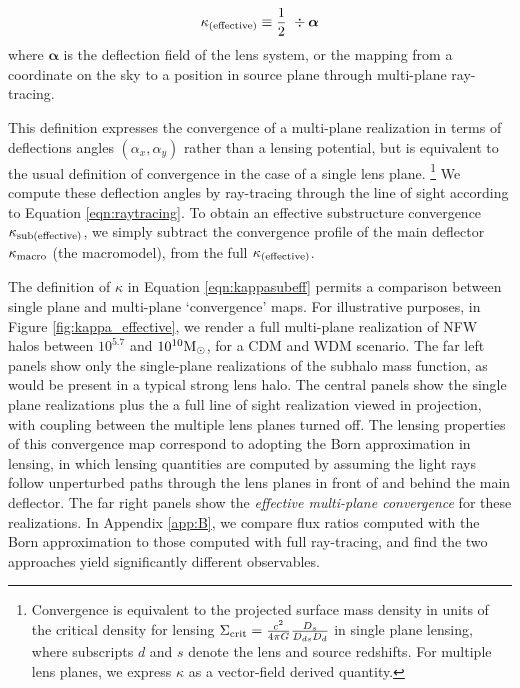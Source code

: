 \begin{equation}
\label{eqn:kappasubeff}
\kappa_{\rm{(effective)}}  \equiv \frac{1}{2} \ \div{ \boldsymbol{\alpha}}
\end{equation}
where $\boldsymbol{\alpha}$ is the deflection field of the lens system, or the mapping from a coordinate on the sky to a position in source plane through multi-plane ray-tracing.

This definition expresses the convergence of a multi-plane realization in terms of deflections angles $\left(\alpha_x, \alpha_y\right)$ rather than a lensing potential, but is equivalent to the usual definition of convergence in the case of a single lens plane. \footnote{Convergence is equivalent to the projected surface mass density in units of the critical density for lensing $\Sigma_{\rm{crit}} = \frac{c^2}{4 \pi G}\frac{D_s}{D_{ds} D_d}$ in single plane lensing, where subscripts $d$ and $s$ denote the lens and source redshifts. For multiple lens planes, we express $\kappa$ as a vector-field derived quantity.} We compute these deflection angles by ray-tracing through the line of sight according to Equation \ref{eqn:raytracing}. To obtain an effective substructure convergence $\kappa_{\rm{sub(effective)}}$, we simply subtract the convergence profile of the main deflector $\kappa_{\rm{macro}}$ (the macromodel), from the full $\kappa_{\rm{(effective)}}$. 

The definition of $\kappa$ in Equation \ref{eqn:kappasubeff} permits a comparison between single plane and multi-plane `convergence' maps. For illustrative purposes, in Figure \ref{fig:kappa_effective}, we render a full multi-plane realization of NFW halos between $10^{5.7}$ and $10^{10} {\rm{M}_{\odot}}$, for a CDM and WDM scenario. The far left panels show only the single-plane realizations of the subhalo mass function, as would be present in a typical strong lens halo. The central panels show the single plane realizations plus the a full line of sight realization viewed in projection, with coupling between the multiple lens planes turned off. The lensing properties of this convergence map correspond to adopting the Born approximation in lensing, in which lensing quantities are computed by assuming the light rays follow unperturbed paths through the lens planes in front of and behind the main deflector. The far right panels show the \textit{effective multi-plane convergence} for these realizations. In Appendix \ref{app:B}, we compare flux ratios computed with the Born approximation to those computed with full ray-tracing, and find the two approaches yield significantly different observables. 


